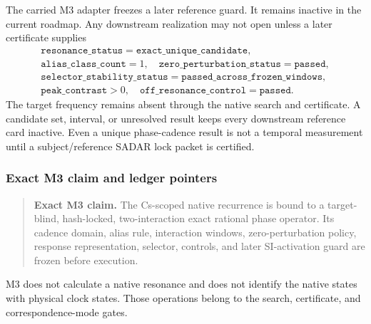 The carried M3 adapter freezes a later reference guard.  It remains inactive
in the current roadmap.  Any downstream realization may not open unless
a later certificate supplies
\[
\begin{gathered}
\texttt{resonance\_status}=\texttt{exact\_unique\_candidate},\\
\texttt{alias\_class\_count}=1,
\quad
\texttt{zero\_perturbation\_status}=\texttt{passed},\\
\texttt{selector\_stability\_status}=\texttt{passed\_across\_frozen\_windows},\\
\texttt{peak\_contrast}>0,
\quad
\texttt{off\_resonance\_control}=\texttt{passed}.
\end{gathered}
\]
The target frequency remains absent through the native search and certificate.
A candidate set, interval, or unresolved result keeps every downstream
reference card inactive.  Even a unique phase-cadence result is not a temporal
measurement until a subject/reference SADAR lock packet is certified.

\subsubsection{Exact M3 claim and ledger pointers}

\begin{quote}
\textbf{Exact M3 claim.}
The Cs-scoped native recurrence is bound to a target-blind, hash-locked,
two-interaction exact rational phase operator.  Its cadence domain, alias rule,
interaction windows, zero-perturbation policy, response representation,
selector, controls, and later SI-activation guard are frozen before execution.
\end{quote}

M3 does not calculate a native resonance and does not identify the native
states with physical clock states.  Those operations belong to the search,
certificate, and correspondence-mode gates.

